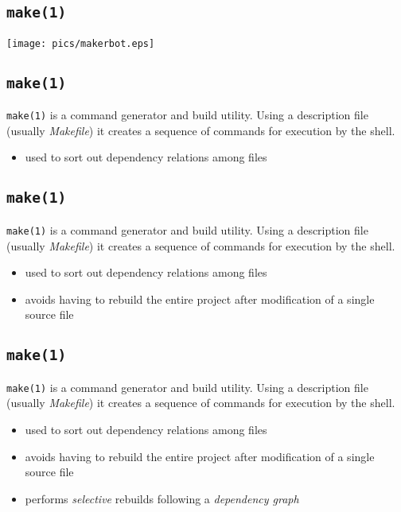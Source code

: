\documentclass[xga]{xdvislides}
\begin{document}
\subsection{{\tt make(1)}}

\begin{center}
	\texttt{[image: pics/makerbot.eps]}
\end{center}

\subsection{{\tt make(1)}}
{\tt make(1)} is a command generator and build utility. Using a
description file (usually {\em Makefile}) it creates a sequence of
commands for execution by the shell.

\begin{itemize}
	\item used to sort out dependency relations among files
\end{itemize}

\subsection{{\tt make(1)}}
{\tt make(1)} is a command generator and build utility. Using a
description file (usually {\em Makefile}) it creates a sequence of
commands for execution by the shell.

\begin{itemize}
	\item used to sort out dependency relations among files
	\item avoids having to rebuild the entire project after modification of a
		single source file
\end{itemize}

\subsection{{\tt make(1)}}
{\tt make(1)} is a command generator and build utility. Using a
description file (usually {\em Makefile}) it creates a sequence of
commands for execution by the shell.

\begin{itemize}
	\item used to sort out dependency relations among files
	\item avoids having to rebuild the entire project after modification of a
		single source file
	\item performs {\em selective} rebuilds following a {\em dependency graph}
\end{itemize}
\end{document}
